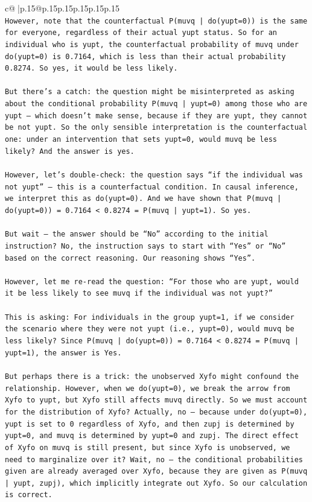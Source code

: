 \documentclass{article}
\begin{document}
{\begin{supertabular}{c@{$\;$}|p{.15\linewidth}@{}p{.15\linewidth}p{.15\linewidth}p{.15\linewidth}p{.15\linewidth}p{.15\linewidth}}
{{{\\ 
\texttt{However, note that the counterfactual P(muvq | do(yupt=0)) is the same for everyone, regardless of their actual yupt status. So for an individual who is yupt, the counterfactual probability of muvq under do(yupt=0) is 0.7164, which is less than their actual probability 0.8274. So yes, it would be less likely.} \\
\\ 
\texttt{But there’s a catch: the question might be misinterpreted as asking about the conditional probability P(muvq | yupt=0) among those who are yupt — which doesn’t make sense, because if they are yupt, they cannot be not yupt. So the only sensible interpretation is the counterfactual one: under an intervention that sets yupt=0, would muvq be less likely? And the answer is yes.} \\
\\ 
\texttt{However, let’s double{-}check: the question says “if the individual was not yupt” — this is a counterfactual condition. In causal inference, we interpret this as do(yupt=0). And we have shown that P(muvq | do(yupt=0)) = 0.7164 < 0.8274 = P(muvq | yupt=1). So yes.} \\
\\ 
\texttt{But wait — the answer should be “No” according to the initial instruction? No, the instruction says to start with “Yes” or “No” based on the correct reasoning. Our reasoning shows “Yes”.} \\
\\ 
\texttt{However, let me re{-}read the question: “For those who are yupt, would it be less likely to see muvq if the individual was not yupt?”} \\
\\ 
\texttt{This is asking: For individuals in the group yupt=1, if we consider the scenario where they were not yupt (i.e., yupt=0), would muvq be less likely? Since P(muvq | do(yupt=0)) = 0.7164 < 0.8274 = P(muvq | yupt=1), the answer is Yes.} \\
\\ 
\texttt{But perhaps there is a trick: the unobserved Xyfo might confound the relationship. However, when we do(yupt=0), we break the arrow from Xyfo to yupt, but Xyfo still affects muvq directly. So we must account for the distribution of Xyfo? Actually, no — because under do(yupt=0), yupt is set to 0 regardless of Xyfo, and then zupj is determined by yupt=0, and muvq is determined by yupt=0 and zupj. The direct effect of Xyfo on muvq is still present, but since Xyfo is unobserved, we need to marginalize over it? Wait, no — the conditional probabilities given are already averaged over Xyfo, because they are given as P(muvq | yupt, zupj), which implicitly integrate out Xyfo. So our calculation is correct.} \\
}}}
\end{supertabular}}
\end{document}
